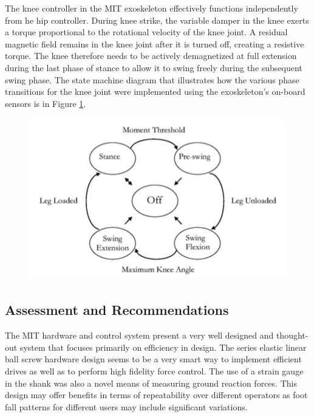  The knee controller in the MIT exoskeleton effectively functions independently from he hip controller.  During knee strike, the variable damper in the knee exerts a torque proportional to the rotational velocity of the knee joint.  A residual magnetic field remains in the knee joint after it is turned off, creating a resistive torque.  The knee therefore needs to be actively demagnetized at full extension during the last phase of stance to allow it to swing freely during the subsequent swing phase.  The state machine diagram that illustrates how the various phase transitions for the knee joint were implemented using the exoskeleton's on-board sensors is in Figure \ref{fig:kneeControl}.
  \begin{figure}[thpb]
\centering
\includegraphics[width=3.in]{exos/figs/MIT/kneeControl}
  \caption{}
  \vspace{-0.2in}
 \label{fig:kneeControl} 
 \end{figure}  
  
  
% 
 
 
 \subsection{Assessment and Recommendations}
 
 The MIT hardware and control system present a very well designed and thought-out system that focuses primarily on efficiency in design.  The series elastic linear ball screw hardware design seems to be a very smart way to implement efficient drives as well as to perform high fidelity force control.  The use of a strain gauge in the shank was also a novel means of measuring ground reaction forces.  This design may offer benefits in terms of repeatability over different operators as foot fall patterns for different users may include significant variations.
 
